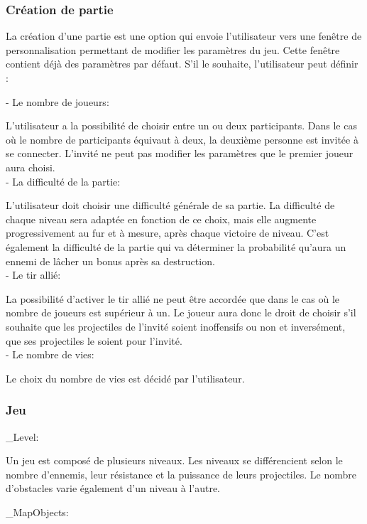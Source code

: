\documentclass[a4paper,12pt]{article}
\begin{document}
\subsubsection{Création de partie}
La création d'une partie est une option qui envoie l'utilisateur vers une fenêtre de personnalisation permettant de modifier les paramètres du jeu.
Cette fenêtre contient déjà des paramètres par défaut.
S'il le souhaite, l'utilisateur peut définir :

- Le nombre de joueurs: 

L'utilisateur a la possibilité de choisir entre un ou deux participants. Dans le cas où le nombre de participants équivaut à deux, la deuxième personne est invitée à se connecter. L’invité ne peut pas modifier les paramètres que le premier joueur aura choisi. \\

- La difficulté de la partie:

 L'utilisateur doit choisir une difficulté générale de sa partie. La difficulté de chaque niveau sera adaptée en fonction de ce choix, mais elle augmente progressivement au fur et à mesure, après chaque victoire de niveau. C'est également la difficulté de la partie qui va déterminer la probabilité qu'aura un ennemi de lâcher un bonus après sa destruction. \\

- Le tir allié: 

La possibilité d'activer le tir allié ne peut être accordée que dans le cas où le nombre de joueurs est supérieur à un.
Le joueur aura donc le droit de choisir s'il souhaite que les projectiles de l'invité soient inoffensifs ou non et inversément, que ses projectiles le soient pour l'invité. \\

- Le nombre de vies: 

Le choix du nombre de vies est décidé par l'utilisateur. \\

\subsubsection{Jeu}

\_Level:

Un jeu est composé de plusieurs niveaux. Les niveaux se différencient selon le nombre d'ennemis, leur résistance et la puissance de leurs projectiles. Le nombre d'obstacles varie également d'un niveau à l'autre.

\_MapObjects: 
\end{document}
